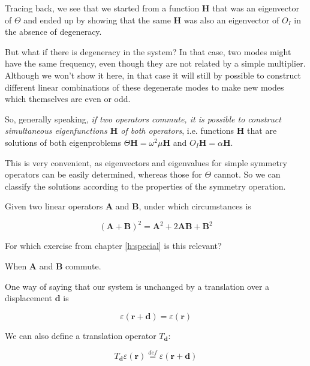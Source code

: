 Tracing back, we see that we started from a function ${\mathbf H}$ that was an eigenvector of $\Theta$ and ended up by showing that the same ${\mathbf H}$ was also an eigenvector of $O_I$ in the absence of degeneracy. 

But what if there is degeneracy in the system? In that case, two modes might have the same frequency, even though they are not related by a simple multiplier. Although we won't show it here, in that case it will still by possible to construct different linear combinations of these degenerate modes to make new modes which themselves are even or odd.

So, generally speaking, \emph{if two operators commute, it is possible to construct simultaneous eigenfunctions ${\mathbf H}$ of both operators}, i.e. functions ${\mathbf H}$ that are solutions of both eigenproblems $\Theta {\mathbf H} = \omega^2 \mu {\mathbf H}$ and $O_I {\mathbf H} = \alpha {\mathbf H}$.

This is very convenient, as eigenvectors and eigenvalues for simple symmetry operators can be easily determined, whereas those for $\Theta$ cannot. So we can classify the solutions according to the properties of the symmetry operation.


\begin{exer}
Given two linear operators $\mathbf A$ and $\mathbf B$, under which circumstances is

$$\left ( {\mathbf A} + {\mathbf B} \right ) ^2 =  {\mathbf A}^2 + 2 {\mathbf A}{\mathbf B}  + {\mathbf B}^2$$

For which exercise from chapter \ref{h:special} is this relevant?
\begin{sol}
When $\mathbf A$ and $\mathbf B$ commute.
\end{sol}
\end{exer}

\pagebreak


One way of saying that our system is unchanged by a translation over a displacement ${\mathbf d}$ is

\begin{equation}
\varepsilon ({\mathbf r} + {\mathbf d}) =  \varepsilon ({\mathbf r})
\end{equation} 

We can also define a translation operator $T_{\mathbf d}$:

\begin{equation}
T_{\mathbf d} \varepsilon ({\mathbf r}) \stackrel{def}{=} \varepsilon ({\mathbf r} + {\mathbf d})
\end{equation} 

